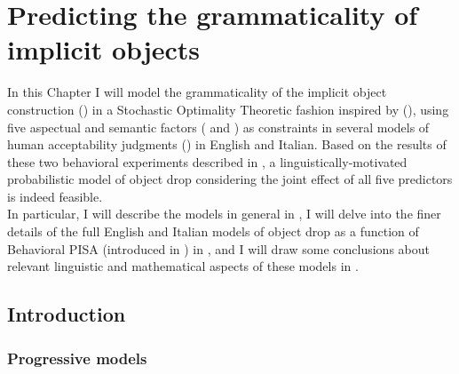 \setchapterpreamble[u]{\margintoc}
\chapter{Predicting the grammaticality of implicit objects}

In this Chapter I will model the grammaticality of the implicit object construction () in a Stochastic Optimality Theoretic fashion inspired by \textcite{Medina2007} (), using five aspectual and semantic factors ( and ) as constraints in several models of human acceptability judgments () in English and Italian. Based on the results of these two behavioral experiments described in , a linguistically-motivated probabilistic model of object drop considering the joint effect of all five predictors is indeed feasible.\\
In particular, I will describe the models in general in , I will delve into the finer details of the full English and Italian models of object drop as a function of Behavioral PISA (introduced in ) in , and I will draw some conclusions about relevant linguistic and mathematical aspects of these models in .

\section{Introduction} 

\subsection{Progressive models} 

